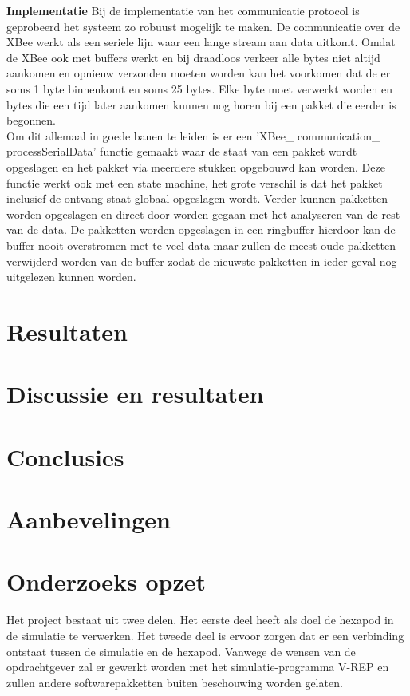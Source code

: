 \documentclass[10pt,a4paper]{article}
\begin{document}
\textbf{Implementatie}
Bij de implementatie van het communicatie protocol is geprobeerd het systeem zo robuust mogelijk te maken. De communicatie over de XBee werkt als een seriele lijn waar een lange stream aan data uitkomt. Omdat de XBee ook met buffers werkt en bij draadloos verkeer alle bytes niet altijd aankomen en opnieuw verzonden moeten worden kan het voorkomen dat de er soms 1 byte binnenkomt en soms 25 bytes. Elke byte moet verwerkt worden en bytes die een tijd later aankomen kunnen nog horen bij een pakket die eerder is begonnen.\\
Om dit allemaal in goede banen te leiden is er een  'XBee\_ communication\_ processSerialData' functie gemaakt waar de staat van een pakket wordt opgeslagen en het pakket via meerdere stukken opgebouwd kan worden. Deze functie werkt ook met een state machine, het grote verschil is dat het pakket inclusief de ontvang staat globaal opgeslagen wordt. Verder kunnen pakketten worden opgeslagen en direct door worden gegaan met het analyseren van de rest van de data. De pakketten worden opgeslagen in een ringbuffer hierdoor kan de buffer nooit overstromen met te veel data maar zullen de meest oude pakketten verwijderd worden van de buffer zodat de nieuwste pakketten in ieder geval nog uitgelezen kunnen worden.\\

\newpage

\section{Resultaten}
\section{Discussie en resultaten}
\section{Conclusies}
\section{Aanbevelingen}


\section{Onderzoeks opzet}
Het project bestaat uit twee delen. Het eerste deel heeft als doel de hexapod in de simulatie te verwerken. Het tweede deel is ervoor zorgen dat er een verbinding ontstaat tussen de simulatie en de hexapod. 
Vanwege de wensen van de opdrachtgever zal er gewerkt worden met het simulatie-programma V-REP en zullen andere softwarepakketten buiten beschouwing worden gelaten.  
\end{document}
